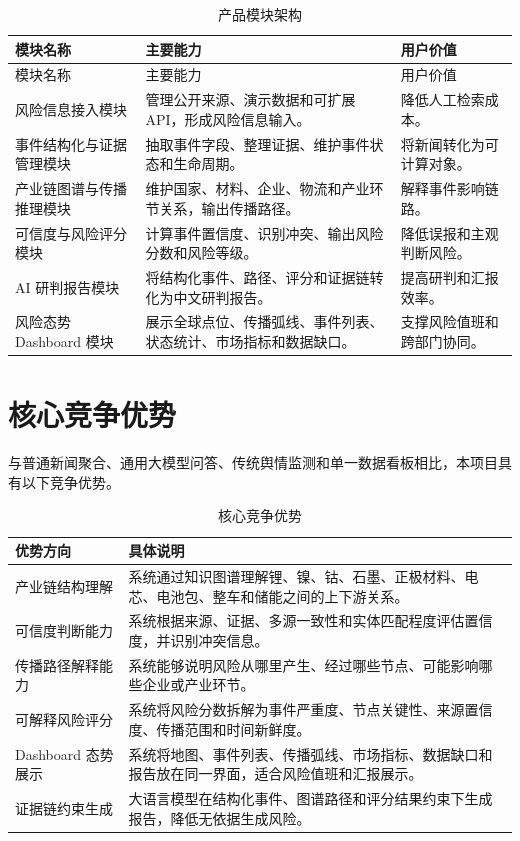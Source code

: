 \documentclass[12pt,a4paper]{ctexart}
\begin{document}
\begin{longtable}{p{3.2cm}p{6.4cm}p{4.0cm}}
\caption{产品模块架构}\label{tab:modules}\\
\toprule
模块名称 & 主要能力 & 用户价值 \\
\midrule
\endfirsthead
\toprule
模块名称 & 主要能力 & 用户价值 \\
\midrule
\endhead
风险信息接入模块 & 管理公开来源、演示数据和可扩展 API，形成风险信息输入。 & 降低人工检索成本。 \\
事件结构化与证据管理模块 & 抽取事件字段、整理证据、维护事件状态和生命周期。 & 将新闻转化为可计算对象。 \\
产业链图谱与传播推理模块 & 维护国家、材料、企业、物流和产业环节关系，输出传播路径。 & 解释事件影响链路。 \\
可信度与风险评分模块 & 计算事件置信度、识别冲突、输出风险分数和风险等级。 & 降低误报和主观判断风险。 \\
AI 研判报告模块 & 将结构化事件、路径、评分和证据链转化为中文研判报告。 & 提高研判和汇报效率。 \\
风险态势 Dashboard 模块 & 展示全球点位、传播弧线、事件列表、状态统计、市场指标和数据缺口。 & 支撑风险值班和跨部门协同。 \\
\bottomrule
\end{longtable}

\section{核心竞争优势}

与普通新闻聚合、通用大模型问答、传统舆情监测和单一数据看板相比，本项目具有以下竞争优势。

\begin{table}[htbp]
\centering
\caption{核心竞争优势}
\begin{tabularx}{\textwidth}{p{3.2cm}X}
\toprule
优势方向 & 具体说明 \\
\midrule
产业链结构理解 & 系统通过知识图谱理解锂、镍、钴、石墨、正极材料、电芯、电池包、整车和储能之间的上下游关系。 \\
可信度判断能力 & 系统根据来源、证据、多源一致性和实体匹配程度评估置信度，并识别冲突信息。 \\
传播路径解释能力 & 系统能够说明风险从哪里产生、经过哪些节点、可能影响哪些企业或产业环节。 \\
可解释风险评分 & 系统将风险分数拆解为事件严重度、节点关键性、来源置信度、传播范围和时间新鲜度。 \\
Dashboard 态势展示 & 系统将地图、事件列表、传播弧线、市场指标、数据缺口和报告放在同一界面，适合风险值班和汇报展示。 \\
证据链约束生成 & 大语言模型在结构化事件、图谱路径和评分结果约束下生成报告，降低无依据生成风险。 \\
\bottomrule
\end{tabularx}
\end{table}
\end{document}
